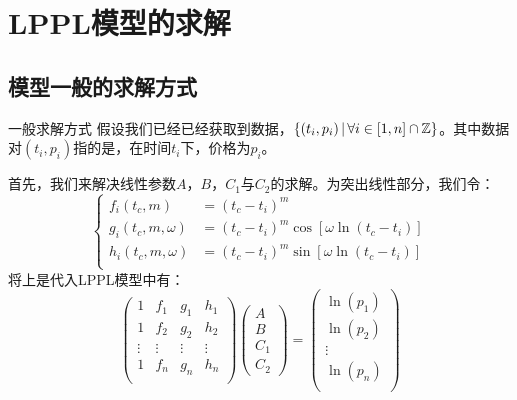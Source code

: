 \section{LPPL模型的求解}
\subsection*{模型一般的求解方式}
\begin{frame}[t]{一般求解方式}
    假设我们已经已经获取到数据，$\left\{(t_i,p_i)\,|\,\forall i\in[1,n]\cap\mathbb{Z}\right\}$。其中数据对$(t_i,p_i)$指的是，在时间$t_i$下，价格为$p_i$。
    
    首先，我们来解决线性参数$A$，$B$，$C_1$与$C_2$的求解。为突出线性部分，我们令：
    \begin{equation*}
        \begin{cases}
            f_i(t_c,m)        &= (t_c-t_i)^m \\
            g_i(t_c,m,\omega) &= (t_c-t_i)^m\cos\left[\omega\ln(t_c-t_i)\right] \\
            h_i(t_c,m,\omega) &= (t_c-t_i)^m\sin\left[\omega\ln(t_c-t_i)\right] \\
        \end{cases}
    \end{equation*}
    将上是代入LPPL模型中有：
    \begin{equation*}
        \begin{pmatrix}
            1      & f_1    & g_1    & h_1    \\
            1      & f_2    & g_2    & h_2    \\
            \vdots & \vdots & \vdots & \vdots \\
            1      & f_n    & g_n    & h_n    \\
        \end{pmatrix}
        \begin{pmatrix}
            A \\ B \\ C_1 \\ C_2
        \end{pmatrix}
        =
        \begin{pmatrix}
            \ln(p_1) \\ \ln(p_2) \\ \vdots \\ \ln(p_n) \\
        \end{pmatrix}
    \end{equation*}
\end{frame}

